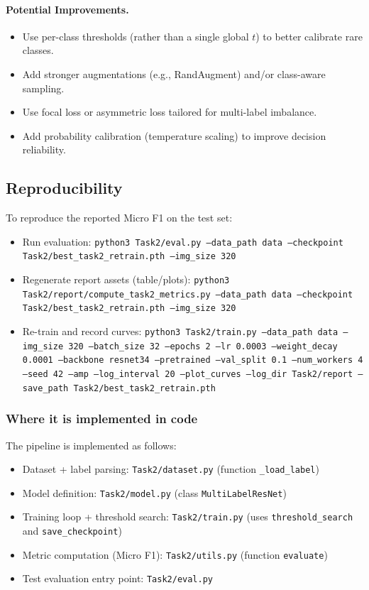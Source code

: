 \paragraph{Potential Improvements.}
\begin{itemize}
  \item Use per-class thresholds (rather than a single global $t$) to better calibrate rare classes.
  \item Add stronger augmentations (e.g., RandAugment) and/or class-aware sampling.
  \item Use focal loss or asymmetric loss tailored for multi-label imbalance.
  \item Add probability calibration (temperature scaling) to improve decision reliability.
\end{itemize}

\subsection{Reproducibility}
To reproduce the reported Micro F1 on the test set:
\begin{itemize}
  \item Run evaluation: \texttt{python3 Task2/eval.py --data\_path data --checkpoint Task2/best\_task2\_retrain.pth --img\_size 320}
  \item Regenerate report assets (table/plots): \texttt{python3 Task2/report/compute\_task2\_metrics.py --data\_path data --checkpoint Task2/best\_task2\_retrain.pth --img\_size 320}
  \item Re-train and record curves: \texttt{python3 Task2/train.py --data\_path data --img\_size 320 --batch\_size 32 --epochs 2 --lr 0.0003 --weight\_decay 0.0001 --backbone resnet34 --pretrained --val\_split 0.1 --num\_workers 4 --seed 42 --amp --log\_interval 20 --plot\_curves --log\_dir Task2/report --save\_path Task2/best\_task2\_retrain.pth}
\end{itemize}

\subsubsection{Where it is implemented in code}
The pipeline is implemented as follows:
\begin{itemize}
  \item Dataset + label parsing: \texttt{Task2/dataset.py} (function \texttt{\_load\_label})
  \item Model definition: \texttt{Task2/model.py} (class \texttt{MultiLabelResNet})
  \item Training loop + threshold search: \texttt{Task2/train.py} (uses \texttt{threshold\_search} and \texttt{save\_checkpoint})
  \item Metric computation (Micro F1): \texttt{Task2/utils.py} (function \texttt{evaluate})
  \item Test evaluation entry point: \texttt{Task2/eval.py}
\end{itemize}